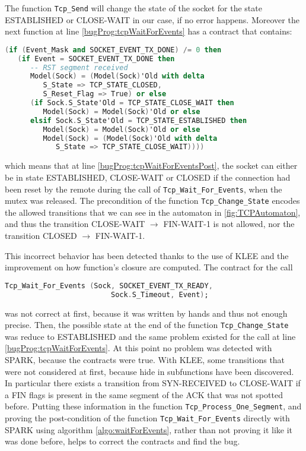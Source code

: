 \documentclass[a4paper, 10pt]{article}
\let\state\textsf
\newcommand\ESTABLISHED{\state{ESTABLISHED}}
\newcommand\SYNRECEIVED{\state{SYN-RECEIVED}}
\newcommand\CLOSED{\state{CLOSED}}
\newcommand\CLOSEWAIT{\state{CLOSE-WAIT}}
\newcommand\FINWAITONE{\state{FIN-WAIT-1}}
\begin{document}
    The function \lstinline[language=Ada]{Tcp_Send} will change the state of the socket for
    the state \ESTABLISHED{} or \CLOSEWAIT{} in our case, if no error happens. Moreover the next
    function at line \ref{bugProg:tcpWaitForEvents} has a contract that contains:
    \begin{lstlisting}[language=Ada, basicstyle=\ttfamily\small]
(if (Event_Mask and SOCKET_EVENT_TX_DONE) /= 0 then
   (if Event = SOCKET_EVENT_TX_DONE then
      -- RST segment received
      Model(Sock) = (Model(Sock)'Old with delta
         S_State => TCP_STATE_CLOSED,
         S_Reset_Flag => True) or else
      (if Sock.S_State'Old = TCP_STATE_CLOSE_WAIT then
         Model(Sock) = Model(Sock)'Old or else
      elsif Sock.S_State'Old = TCP_STATE_ESTABLISHED then
         Model(Sock) = Model(Sock)'Old or else
         Model(Sock) = (Model(Sock)'Old with delta
            S_State => TCP_STATE_CLOSE_WAIT))))
    \end{lstlisting}
    which means that at line \ref{bugProg:tcpWaitForEventsPost}, the socket can either be
    in state \ESTABLISHED{}, \CLOSEWAIT{} or \CLOSED{} if the connection had been reset by the remote
    during the call of \lstinline[language=Ada]{Tcp_Wait_For_Events}, when the mutex was released.
    The precondition of the function \lstinline[language=Ada]{Tcp_Change_State} encodes the allowed
    transitions that we can see in the automaton in \ref{fig:TCPAutomaton}, and thus the transition
    \CLOSEWAIT{} $\rightarrow$ \FINWAITONE{} is not allowed, nor the transition \CLOSED{} $\rightarrow$ \FINWAITONE{}.

    This incorrect behavior has been detected thanks to the use of KLEE and the improvement
    on how function's closure are computed. The contract for the call
    \begin{lstlisting}[language=Ada, basicstyle=\ttfamily\small]
    Tcp_Wait_For_Events (Sock, SOCKET_EVENT_TX_READY,
                         Sock.S_Timeout, Event);
    \end{lstlisting}
    was not correct at first, because it was written by hands and thus not enough precise.
    Then, the possible state at the end of the function \lstinline[language=Ada]{Tcp_Change_State}
    was reduce to \ESTABLISHED{} and the same problem existed for the call
    at line \ref{bugProg:tcpWaitForEvents}. At this point no problem was detected with SPARK,
    because the contracts were true. With KLEE, some transitions that were not considered at first,
    because hide in subfunctions have been discovered. In particular there exists a transition from
    \SYNRECEIVED{} to \CLOSEWAIT{} if a FIN flags is present in the same segment of the ACK that was not
    spotted before. Putting these information in the function \lstinline[language=Ada]{Tcp_Process_One_Segment},
    and proving the post-condition of the function \lstinline[language=Ada]{Tcp_Wait_For_Events}
    directly with SPARK using algorithm \ref{algo:waitForEvents}, rather than not proving it like
    it was done before, helps to correct the contracts and find the bug.
    
\end{document}
